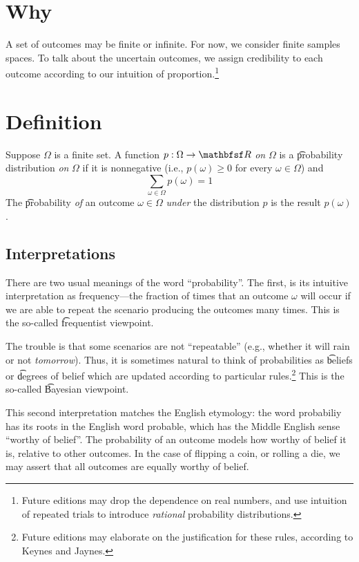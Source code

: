 
\section*{Why}

A set of outcomes may be finite or infinite.
For now, we consider finite samples spaces.
To talk about the uncertain outcomes, we assign credibility to each outcome according to our intuition of proportion.\footnote{Future editions may drop the dependence on real numbers, and use intuition of repeated trials to introduce \textit{rational} probability distributions.}

\section*{Definition}

Suppose $\Omega $ is a finite set.
A function $p: \Omega  \to \R $ \textit{on} $\Omega $ is a \t{probability distribution} \textit{on} $\Omega $ if it is nonnegative (i.e., $p(\omega ) \geq 0$ for every $\omega  \in \Omega $) and
\[
\textstyle
\sum_{\omega  \in \Omega } p(\omega ) = 1
\]
The \t{probability} \textit{of} an outcome $\omega  \in \Omega $ \textit{under} the distribution $p$ is the result $p(\omega )$.

\subsection*{Interpretations}

There are two usual meanings of the word ``probability''.
The first, is its intuitive interpretation as frequency---the fraction of times that an outcome $\omega $ will occur if we are able to repeat the scenario producing the outcomes many times.
This is the so-called \t{frequentist} viewpoint.

The trouble is that some scenarios are not ``repeatable'' (e.g., whether it will rain or not \textit{tomorrow}).
Thus, it is sometimes natural to think of probabilities as \t{beliefs} or \t{degrees of belief} which are updated according to particular rules.\footnote{Future editions may elaborate on the justification for these rules, according to Keynes and Jaynes.}
This is the so-called \t{Bayesian viewpoint}.

This second interpretation matches the English etymology: the word probabiliy has its roots in the English word probable, which has the Middle English sense ``worthy of belief''.
The probability of an outcome models how worthy of belief it is, relative to other outcomes.
In the case of flipping a coin, or rolling a die, we may assert that all outcomes are equally worthy of belief.

